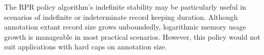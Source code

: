 The RPR policy algorithm's indefinite stability may be particularly useful in scenarios of indefinite or indeterminate record keeping duration.
Although annotation extant record size grows unboundedly, logarithmic memory usage growth is manageable in most practical scenarios.
However, this policy would not suit applications with hard caps on annotation size. %

